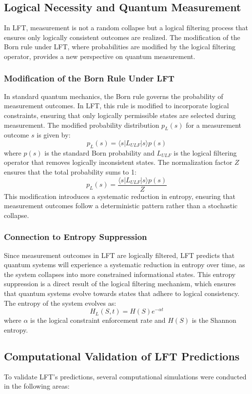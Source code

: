 \subsection{Logical Necessity and Quantum Measurement}
In LFT, measurement is not a random collapse but a logical filtering process that ensures only logically consistent outcomes are realized. The modification of the Born rule under LFT, where probabilities are modified by the logical filtering operator, provides a new perspective on quantum measurement.

\subsubsection{Modification of the Born Rule Under LFT}
In standard quantum mechanics, the Born rule governs the probability of measurement outcomes. In LFT, this rule is modified to incorporate logical constraints, ensuring that only logically permissible states are selected during measurement. The modified probability distribution \( p_L(s) \) for a measurement outcome \( s \) is given by:
\[
p_L(s) = \langle s | L_{ULF} | s \rangle p(s)
\]
where \( p(s) \) is the standard Born probability and \( L_{ULF} \) is the logical filtering operator that removes logically inconsistent states. The normalization factor \( Z \) ensures that the total probability sums to 1:
\[
p_L(s) = \frac{\langle s | L_{ULF} | s \rangle p(s)}{Z}
\]
This modification introduces a systematic reduction in entropy, ensuring that measurement outcomes follow a deterministic pattern rather than a stochastic collapse.

\subsubsection{Connection to Entropy Suppression}
Since measurement outcomes in LFT are logically filtered, LFT predicts that quantum systems will experience a systematic reduction in entropy over time, as the system collapses into more constrained informational states. This entropy suppression is a direct result of the logical filtering mechanism, which ensures that quantum systems evolve towards states that adhere to logical consistency. The entropy of the system evolves as:
\[
H_L(S, t) = H(S) e^{-\alpha t}
\]
where \( \alpha \) is the logical constraint enforcement rate and \( H(S) \) is the Shannon entropy.

\subsection{Computational Validation of LFT Predictions}
To validate LFT's predictions, several computational simulations were conducted in the following areas:

